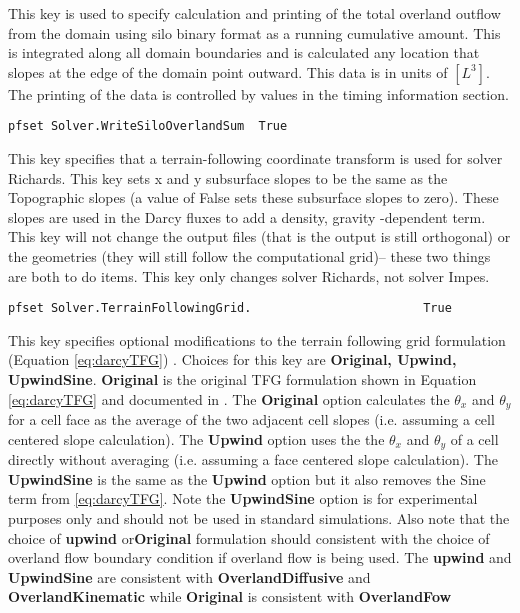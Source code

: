 {
This key is used to specify calculation and printing of the total overland outflow from the domain using silo binary format as a running cumulative amount.   This is integrated along all domain boundaries and is calculated any location that slopes at the edge of the domain point outward. This data is in units of $[L^3]$.
The printing of the data is controlled by values in the
timing information section.
}
\begin{display}\begin{verbatim}
pfset Solver.WriteSiloOverlandSum  True
\end{verbatim}\end{display}

{
This key specifies that a terrain-following coordinate transform is used for solver Richards. This key sets x and y subsurface slopes to be the same as the Topographic slopes (a value of False sets these subsurface slopes to zero).
These slopes are used in the Darcy fluxes to add a density, gravity -dependent term.  This key will not change the output files (that is the output is still orthogonal) or the geometries (they will still follow the computational grid)-- these two things are both to do items.  This key only changes solver Richards, not solver Impes.
}

\begin{display}\begin{verbatim}
pfset Solver.TerrainFollowingGrid.                        True
\end{verbatim}\end{display}

{
This key specifies optional modifications to the terrain following grid formulation (Equation \ref{eq:darcyTFG}) .  Choices for this key are {\bf Original, Upwind, UpwindSine}.
{\bf Original} is the original TFG formulation shown in Equation \ref{eq:darcyTFG} and documented in \cite{M13}.  The {\bf Original} option calculates the $\theta_x$ and $\theta_y$ for a cell face as the average of the two adjacent cell slopes (i.e. assuming a cell centered slope calculation). The {\bf Upwind} option uses the the $\theta_x$ and $\theta_y$ of a cell directly without averaging (i.e. assuming a face centered slope calculation). The {\bf UpwindSine} is the same as the {\bf Upwind} option but it also removes the Sine term from \ref{eq:darcyTFG}. Note the {\bf UpwindSine} option is for experimental purposes only and should not be used in standard simulations.  Also note that the choice of {\bf upwind} or{\bf Original} formulation should consistent with the choice of overland flow boundary condition if overland flow is being used.  The {\bf upwind} and {\bf UpwindSine} are consistent with {\bf OverlandDiffusive} and {\bf OverlandKinematic} while {\bf Original} is consistent with {\bf OverlandFow}
}

